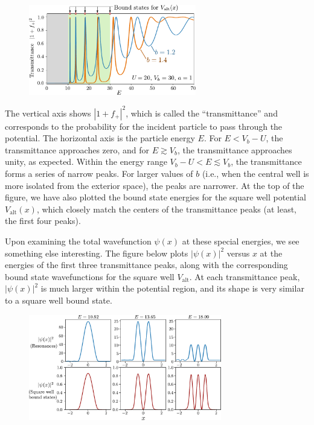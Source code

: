 \documentclass[pra,12pt]{revtex4}
\begin{document}
\begin{figure}[h]
  \centering\includegraphics[width=0.65\textwidth]{resonances}
\end{figure}

The vertical axis shows $|1+f_+|^2$, which is called the
``transmittance'' and corresponds to the probability for the incident
particle to pass through the potential.  The horizontal axis is the
particle energy $E$.  For $E < V_b-U$, the transmittance approaches
zero, and for $E \gtrsim V_b$, the transmittance approaches unity, as
expected.  Within the energy range $V_b-U < E \lesssim V_b$, the
transmittance forms a series of narrow peaks.  For larger values of
$b$ (i.e., when the central well is more isolated from the exterior
space), the peaks are narrower.  At the top of the figure, we have
also plotted the bound state energies for the square well potential
$V_{\mathrm{alt}}(x)$, which closely match the centers of the
transmittance peaks (at least, the first four peaks).

Upon examining the total wavefunction $\psi(x)$ at these special
energies, we see something else interesting.  The figure below plots
$|\psi(x)|^2$ versus $x$ at the energies of the first three
transmittance peaks, along with the corresponding bound state
wavefunctions for the square well $V_{\mathrm{alt}}$.  At each
transmittance peak, $|\psi(x)|^2$ is much larger within the potential
region, and its shape is very similar to a square well bound state.

\begin{figure}[h]
  \centering\includegraphics[width=0.75\textwidth]{resonancewavefunctions}
\end{figure}
\end{document}
